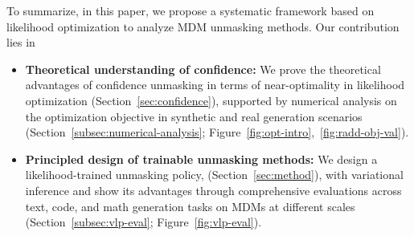To summarize, in this paper, we propose a systematic framework based on likelihood optimization to analyze MDM unmasking methods. Our contribution lies in

\begin{itemize}[noitemsep, topsep=0pt]
    \item \textbf{Theoretical understanding of confidence:} We prove the theoretical advantages of confidence unmasking in terms of near-optimality in likelihood optimization (Section~\ref{sec:confidence}), supported by numerical analysis on the optimization objective in synthetic and real generation scenarios (Section~\ref{subsec:numerical-analysis}; Figure~\ref{fig:opt-intro},~\ref{fig:radd-obj-val}).

    \item \textbf{Principled design of trainable unmasking methods:} We design a likelihood-trained unmasking policy, \alg{} (Section~\ref{sec:method}), with variational inference and show its advantages through comprehensive evaluations across text, code, and math generation tasks on MDMs at different scales (Section~\ref{subsec:vlp-eval}; Figure~\ref{fig:vlp-eval}).

\end{itemize}
